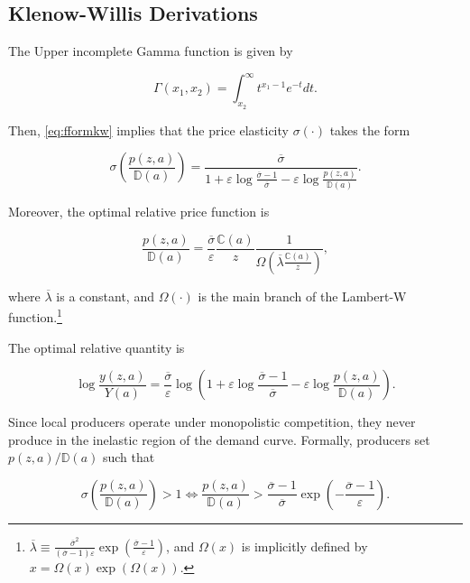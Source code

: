 \subsection{Klenow-Willis Derivations}\label{deriv:klenowwillis}

The Upper incomplete Gamma function is given by

\begin{equation*}
		\Gamma(x_1,x_2) = \int_{x_2}^{\infty} t^{x_1-1}e^{-t}dt.
\end{equation*}

Then, \eqref{eq:fformkw} implies that the price elasticity $\sigma(\cdot)$ takes the form  

\begin{equation*}
	\sigma\left(\frac{p(z,a)}{\mathbb{D}(a)}\right) = \frac{\overline{\sigma}}{1 + \varepsilon \log \frac{\overline{\sigma} - 1}{\overline{\sigma}} - \varepsilon \log \frac{p(z,a)}{\mathbb{D}(a)}}.
\end{equation*}

Moreover, the optimal relative price function is  

\begin{equation*}
	\frac{p(z,a)}{\mathbb{D}(a)} = \frac{\overline{\sigma}}{\varepsilon} \frac{\mathbb{C}(a)}{z} \frac{1}{\Omega\left(\overline{\lambda} \frac{\mathbb{C}(a)}{z}\right)},
\end{equation*}

where $\overline{\lambda}$ is a constant, and $\Omega(\cdot)$ is the main branch of the Lambert-W function.\footnote{$\overline{\lambda} \equiv \frac{\overline{\sigma}^2}{(\overline{\sigma} - 1) \varepsilon} \exp\left(\frac{\overline{\sigma} - 1}{\varepsilon}\right)$, and $\Omega(x)$ is implicitly defined by $x = \Omega(x) \exp(\Omega(x))$.}  

The optimal relative quantity is  

\begin{equation*}
	\log \frac{y(z,a)}{Y(a)} = \frac{\overline{\sigma}}{\varepsilon} \log\left(1 + \varepsilon \log \frac{\overline{\sigma} - 1}{\overline{\sigma}} - \varepsilon \log \frac{p(z,a)}{\mathbb{D}(a)}\right).
\end{equation*}	

Since local producers operate under monopolistic competition, they never produce in the inelastic region of the demand curve. Formally, producers set $p(z,a)/\mathbb{D}(a)$ such that  

\begin{equation*}
	\sigma\left(\frac{p(z,a)}{\mathbb{D}(a)}\right) > 1 \iff \frac{p(z,a)}{\mathbb{D}(a)} > \frac{\overline{\sigma} - 1}{\overline{\sigma}} \exp\left(-\frac{\overline{\sigma}-1}{\varepsilon}\right).
\end{equation*}

